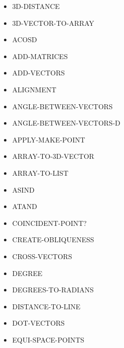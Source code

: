 \documentclass [11pt]{book}
\begin{document}
\begin{itemize}

\item {}3D-DISTANCE

\item {}3D-VECTOR-TO-ARRAY

\item {}ACOSD

\item {}ADD-MATRICES

\item {}ADD-VECTORS

\item {}ALIGNMENT

\item {}ANGLE-BETWEEN-VECTORS

\item {}ANGLE-BETWEEN-VECTORS-D

\item {}APPLY-MAKE-POINT

\item {}ARRAY-TO-3D-VECTOR

\item {}ARRAY-TO-LIST

\item {}ASIND

\item {}ATAND

\item {}COINCIDENT-POINT?

\item {}CREATE-OBLIQUENESS

\item {}CROSS-VECTORS

\item {}DEGREE

\item {}DEGREES-TO-RADIANS

\item {}DISTANCE-TO-LINE

\item {}DOT-VECTORS

\item {}EQUI-SPACE-POINTS


\end{itemize}
\end{document}
